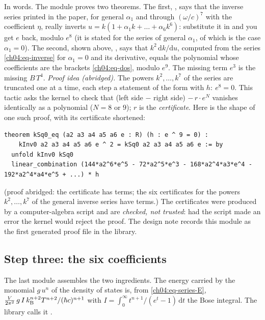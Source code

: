 \noindent In words.
The module proves two theorems.
The first, , says that the inverse series printed in the paper, for general $\alpha_1$ and through $(\omega/c)^7$ with the coefficient $\eta$, really inverts $u=k(1+\alpha_1k+\dots+\alpha_6k^6)$: substitute it in and you get $e$ back, modulo $e^8$ (it is stated for the series  of general $\alpha_1$, of which  is the case $\alpha_1=0$).
The second, shown above, , says that $k^2\,\mathrm dk/\mathrm du$, computed from the series \eqref{ch04:eq-inverse} for $\alpha_1=0$ and its derivative, equals the polynomial whose coefficients are the brackets \eqref{ch04:eq-dos}, modulo $e^9$.
The missing term $e^3$ is the missing $B\,T^4$.
\emph{Proof idea (abridged).} The powers $k^2,\dots,k^7$ of the series are truncated one at a time, each step a statement of the form  with $h:\ e^8=0$.
This tactic asks the kernel to check that (left side $-$ right side) $-\,r\cdot e^N$ vanishes identically as a polynomial ($N=8$ or $9$); $r$ is the \emph{certificate}.
Here is the shape of one such proof, with its certificate shortened:
\begin{lstlisting}[style=lean,basicstyle=\ttfamily\footnotesize]
theorem kSq0_eq (a2 a3 a4 a5 a6 e : R) (h : e ^ 9 = 0) :
    kInv0 a2 a3 a4 a5 a6 e ^ 2 = kSq0 a2 a3 a4 a5 a6 e := by
  unfold kInv0 kSq0
  linear_combination (144*a2^6*e^5 - 72*a2^5*e^3 - 168*a2^4*a3*e^4 - 192*a2^4*a4*e^5 + ...) * h
\end{lstlisting}
\noindent (proof abridged: the certificate has  terms; the six certificates for the powers $k^2,\dots,k^7$ of the general inverse series have  terms.)
The certificates were produced by a computer-algebra script and are \emph{checked, not trusted}: had the script made an error the kernel would reject the proof.
The design note records this module as the first generated proof file in the library.

\subsection{Step three: the six coefficients}
The last module assembles the two ingredients.
The energy carried by the monomial $g\,u^n$ of the density of states is, from \eqref{ch04:eq-series-E}, $\frac{V}{2\pi^2}\,g\,I\,k_{\mathrm B}^{n+2}T^{n+2}/(\hbar c)^{n+1}$ with $I=\int_0^\infty t^{n+1}/(e^t-1)\,\mathrm dt$ the Bose integral.
The library calls it .

